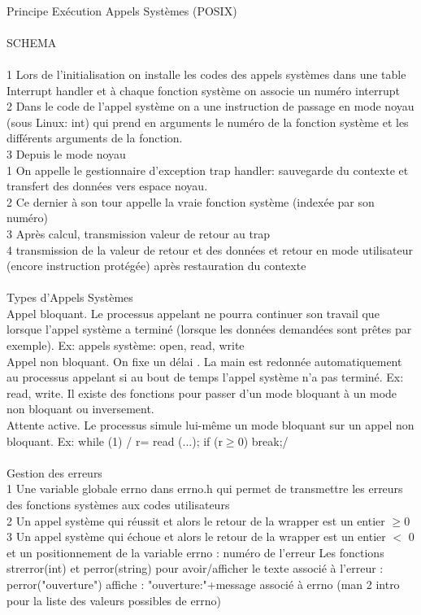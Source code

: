 \documentclass[5pt]{article}
\begin{document}
\begin{scriptsize}
\\
Principe Exécution Appels Systèmes (POSIX)\\
\\SCHEMA\\
\\
1 Lors de l’initialisation on installe les codes des appels systèmes dans une table Interrupt handler et à chaque fonction système on associe un numéro interrupt\\
2 Dans le code de l’appel système on a une instruction de passage en mode noyau (sous Linux: int) qui prend en arguments le numéro de la fonction système et les différents arguments de la fonction.\\
3 Depuis le mode noyau\\
1 On appelle le gestionnaire d’exception trap handler: sauvegarde du contexte et transfert des données vers espace noyau.\\
2 Ce dernier à son tour appelle la vraie fonction système (indexée par son numéro)\\
3 Après calcul, transmission valeur de retour au trap\\
4 transmission de la valeur de retour et des données et retour en mode utilisateur (encore instruction protégée) après restauration du contexte\\
\\
Types d’Appels Systèmes\\
Appel bloquant. Le processus appelant ne pourra continuer son travail que lorsque l’appel système a terminé (lorsque les données demandées sont prêtes par exemple). Ex: appels système: open, read, write\\
Appel non bloquant. On fixe un délai . La main est redonnée automatiquement au processus appelant si au bout de temps l’appel système n’a pas terminé. Ex: read, write. Il existe des fonctions pour passer d’un mode bloquant à un mode non bloquant ou inversement.\\
Attente active. Le processus simule lui-même un mode bloquant sur un appel non bloquant. Ex: while (1) /{ r= read (...); if (r$\geq$0) break;/}\\
\\
Gestion des erreurs\\
1 Une variable globale errno dans errno.h qui permet de transmettre les erreurs des fonctions systèmes aux codes utilisateurs\\
2 Un appel système qui réussit et alors le retour de la wrapper est un entier $\geq$0\\
3 Un appel système qui échoue et alors le retour de la wrapper est un entier $<$ 0 et un positionnement de la variable errno : numéro de l’erreur Les fonctions strerror(int) et perror(string) pour avoir/afficher le texte associé à l’erreur : perror("ouverture") affiche : "ouverture:"+message associé à errno (man 2 intro pour la liste des valeurs possibles de errno)\\

\end{scriptsize}
\end{document}
